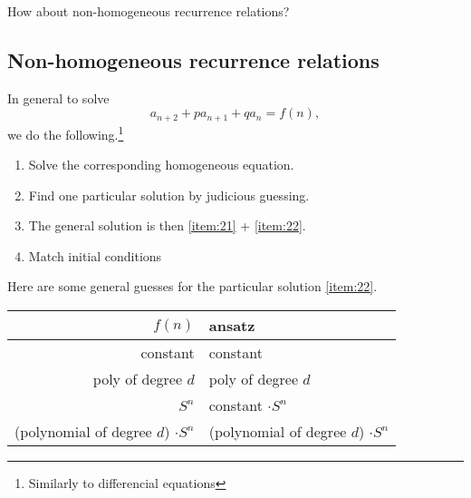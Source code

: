 \documentclass[english]{lbscript}
\begin{document}
How about non-homogeneous recurrence relations?\\

\subsection{Non-homogeneous recurrence relations}
\label{sec:non-homog-recurr}

In general to solve
\begin{equation}
	\label{eq:81}
	a_{n+2} + p a_{n+1} + q a_{n} = f(n),
\end{equation}
we do the following.\footnote{Similarly to differencial equations}
\begin{enumerate}[label=\arabic{*})]
	\item\label{item:21} Solve the corresponding homogeneous equation.
	\item\label{item:22} Find one particular solution by judicious guessing.
	\item\label{item:23} The general solution is then \ref{item:21} + \ref{item:22}.
	\item\label{item:24} Match initial conditions
\end{enumerate}

Here are some general guesses for the particular solution \ref{item:22}.\\
\begin{tabular}{rl}
	\toprule
	\(f(n)\)                                 & ansatz                                   \\
	\midrule
	constant                                 & constant                                 \\
	poly of degree \(d\)                     & poly of degree \(d\)                     \\
	\(S^{n}\)                                & constant \(⋅ S^{n}\)                     \\
	(polynomial of degree \(d\)) \(⋅ S^{n}\) & (polynomial of degree \(d\)) \(⋅ S^{n}\) \\
	\bottomrule
\end{tabular}
\end{document}
